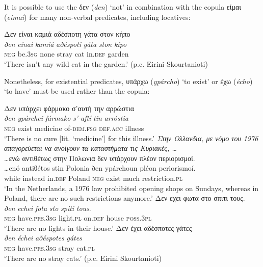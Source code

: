 \documentclass[output=paper]{langsci/langscibook}
\begin{document}
\begin{unindented}
It is possible to use the δεν (\textit{den}) `not' in combination with the
copula είμαι (\textit{eímai}) for many non-verbal predicates, including locatives:
%
\begin{exe}\ex \glll
Δεν είναι καμιά αδέσποτη γάτα στον κήπο \\
\textit{ðen} \textit{eínai} \textit{kamiá} \textit{aðéspoti} \textit{gáta} \textit{ston} \textit{kípo}\\
\textsc{neg} be.\textsc{3sg} none stray cat in.\textsc{def} garden \\
\glt `There isn't any wild cat in the garden.' (p.c. Eirini Skourtanioti)
    \end{exe}

Nonetheless, for existential predicates, υπάρχω (\textit{ypárcho}) `to
exist' or έχω (\textit{écho}) `to have' must be used rather than the copula:
%
\begin{exe}\ex \glll
Δεν υπάρχει φάρμακο σ'αυτή την αρρώστια \\
\textit{ðen} \textit{ypárchei} \textit{fármako} \textit{s’-aftí}
\textit{tin} \textit{arróstia} \\
\textsc{neg} exist medicine of-\textsc{dem.fsg} \textsc{def.acc} illness\\
    \glt `There is no cure [lit. ‘medicine'] for this illness.'
\parencite[493]{HoltonMackridge2012}
\ex \textit{Στην Ολλανδια, με νόμο του 1976 απαγορεύεται να ανοίγουν τα
καταστήματα τις Κυριακές, \ldots}\\
\glll
\ldots{}ενώ αντιθέτως στην Πολωνια δεν υπάρχουν πλέον περιορισμοί. \\
\ldots{}enó antiθétos stin Polonia ðen ypárchoun pléon periorismoí. \\
while instead in.\textsc{def} Poland \textsc{neg} exist much
restriction.\textsc{pl}\\
    \glt `In the Netherlands, a 1976 law prohibited opening shops on Sundays, whereas in Poland, there are no such restrictions anymore.' \citep[483]{Puigdollers2015}
\ex \glll
Δεν εχει φωτα στο σπιτι τους.  \\
\textit{ðen} \textit{echei} \textit{fota} \textit{sto} \textit{spiti} \textit{tous}.  \\
\textsc{neg} have.\textsc{prs.3sg} light.\textsc{pl} on.\textsc{def} house
\textsc{poss.3pl}\\
    \glt `There are no lights in their house.' \parencite[199]{HoltonMackridge2004}
\ex \glll
Δεν έχει αδέσποτες γάτες\\
\textit{ðen} \textit{échei} \textit{aðéspotes} \textit{gátes}\\
\textsc{neg}  have.\textsc{prs.3sg} stray cat.\textsc{pl} \\
    \glt `There are no stray cats.' (p.c. Eirini Skourtanioti)
    \end{exe}


\end{unindented}
\end{document}
